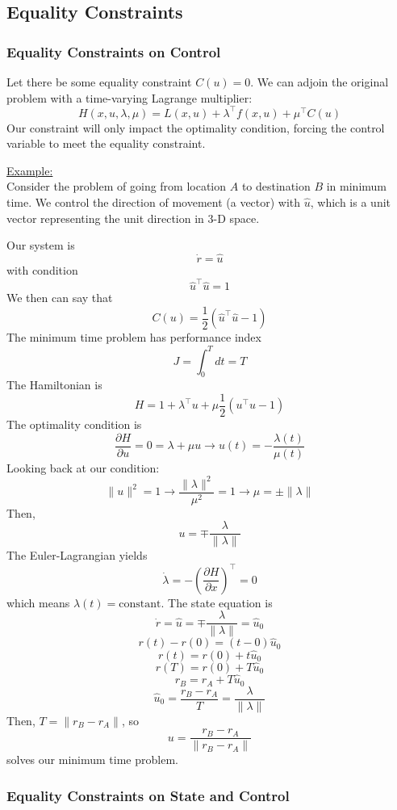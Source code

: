 \documentclass{article}
\begin{document}
\subsection{Equality Constraints}

\subsubsection{Equality Constraints on Control}

\noindent
Let there be some equality constraint $C(u) = 0$. We can adjoin the original problem
with a time-varying Lagrange multiplier:
\[H(x,u,\lambda,\mu) = L(x,u) + \lambda^\top f(x,u) + \mu^\top C(u)\]
Our constraint will only impact the optimality condition, forcing the control variable
to meet the equality constraint.

\noindent
\underline{Example:}\\[2mm]
Consider the problem of going from location $A$ to destination $B$ in minimum time.
We control the direction of movement (a vector) with $\hat{u}$, which is a unit vector
representing the unit direction in 3-D space.

\noindent
Our system is
\[\dot{r} = \hat{u}\]
with condition
\[\hat{u}^\top\hat{u} = 1\]
We then can say that
\[C(u) = \frac{1}{2}(\hat{u}^\top\hat{u} - 1)\]
The minimum time problem has performance index
\[J = \int_{0}^{T}dt = T\]
The Hamiltonian is
\[H = 1 + \lambda^\top u + \mu\frac{1}{2}(u^\top u - 1)\]
The optimality condition is
\[\frac{\partial H}{\partial u} = 0 = \lambda + \mu u
\rightarrow u(t) = -\frac{\lambda(t)}{\mu(t)}\]
Looking back at our condition:
\[\|u\|^2 = 1 \rightarrow \frac{\|\lambda\|^2}{\mu^2} = 1 \rightarrow \mu = \pm\|\lambda\|\]
Then,
\[u = \mp\frac{\lambda}{\|\lambda\|}\]
The Euler-Lagrangian yields
\[\dot{\lambda} = -\left(\frac{\partial H}{\partial x}\right)^\top = 0\]
which means $\lambda(t) = \text{constant}$.
The state equation is
\[\dot{r} = \hat{u} = \mp\frac{\lambda}{\|\lambda\|} = \hat{u}_0\]
\[r(t) - r(0) = (t - 0)\hat{u}_0\]
\[r(t) = r(0) + t\hat{u}_0\]
\[r(T) = r(0) + T\hat{u}_0\]
\[r_B = r_A + T\hat{u}_0\]
\[\hat{u}_0 = \frac{r_B-r_A}{T} = \frac{\lambda}{\|\lambda\|}\]
Then, $T = \|r_B-r_A\|$, so
\[u = \frac{r_B-r_A}{\|r_B-r_A\|}\]
solves our minimum time problem.

\subsubsection{Equality Constraints on State and Control}
\end{document}
